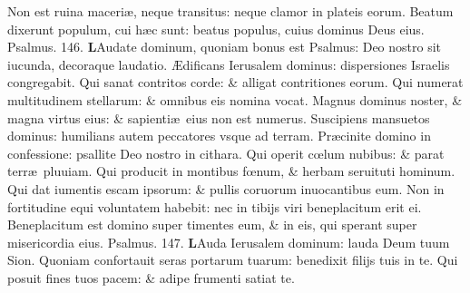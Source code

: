 \documentclass[a5paper,10pt]{book}
\def\ae{æ}
\def\AE{Æ}
\def\oe{œ}
\begin{document}
\begin{multicols*}{2}
\newline \color{red} N\color{black}on est ruina maceri\ae , neque transitus: neque clamor in plateis eorum.
\newline \color{red} B\color{black}eatum dixerunt populum, cui h\ae c sunt: beatus populus, cuius dominus Deus eius. \quad \color{red} Psalmus. \hypertarget{ps146}{146.} \color{black}
\vspace{-.25em}
\lettrine[lines=2]{\bfseries \color{red} L}{}Audate dominum, quoniam bonus est Psalmus: Deo nostro sit iucunda, decoraque laudatio.
\newline \color{red} \AE\color{black}dificans Ierusalem dominus: dispersiones Israelis congregabit.
\newline \color{red} Q\color{black}ui sanat contritos corde: \& alligat contritiones eorum.
\newline \color{red} Q\color{black}ui numerat multitudinem stellarum: \& omnibus eis nomina vocat.
\newline \color{red} M\color{black}agnus dominus noster, \& magna virtus eius: \& sapienti\ae \ eius non est numerus.
\newline \color{red} S\color{black}uscipiens mansuetos dominus: humilians autem peccatores vsque ad terram.
\newline \color{red} P\color{black}r\ae cinite domino in confessione: psallite Deo nostro in cithara.
\newline \color{red} Q\color{black}ui operit c\oe lum nubibus: \& parat terr\ae \ pluuiam.
\newline \color{red} Q\color{black}ui producit in montibus f\oe num, \& herbam seruituti hominum.
\newline \color{red} Q\color{black}ui dat iumentis escam ipsorum: \& pullis coruorum inuocantibus eum.
\newline \color{red} N\color{black}on in fortitudine equi voluntatem habebit: nec in tibijs viri beneplacitum erit ei.
\newline \color{red} B\color{black}eneplacitum est domino super timentes eum, \& in eis, qui sperant super misericordia eius. \quad \color{red} Psalmus. \hypertarget{ps147}{147.} \color{black}
\vspace{-.25em}
\lettrine[lines=2]{\bfseries \color{red} L}{}Auda Ierusalem dominum: lauda Deum tuum Sion.
\newline \color{red} Q\color{black}uoniam confortauit seras portarum tuarum: benedixit filijs tuis in te.
\newline \color{red} Q\color{black}ui posuit fines tuos pacem: \& adipe frumenti satiat te.

\end{multicols*}
\end{document}
